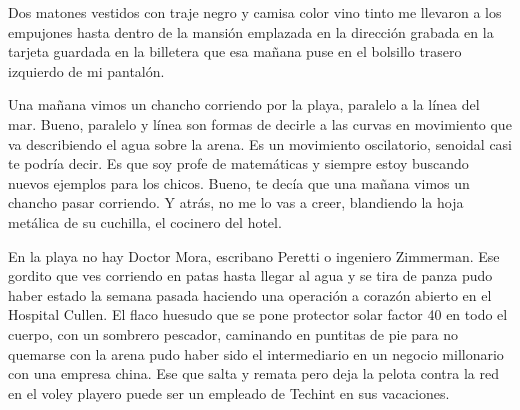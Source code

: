 \documentclass[12pt,twoside,openright,a5paper]{book}
\begin{document}
Dos matones vestidos con traje negro y camisa color vino tinto
me llevaron a los empujones hasta dentro de la mansión emplazada en la
dirección grabada en la tarjeta guardada en la billetera que esa mañana
puse en el bolsillo trasero izquierdo de mi pantalón.


\vspace{0.5cm}

\hrulefill\hspace{0.2cm} \decofourleft\decofourright \hspace{0.2cm} \hrulefill
\vspace{0.5cm}

Una mañana vimos un chancho corriendo por la playa, paralelo a la línea del
mar. Bueno, paralelo y línea son formas de decirle a las curvas en movimiento
que va describiendo el agua sobre la arena. Es un movimiento oscilatorio,
senoidal casi te podría decir. Es que soy profe de matemáticas y siempre
estoy buscando nuevos ejemplos para los chicos. Bueno, te decía que una
mañana vimos un chancho pasar corriendo. Y atrás, no me lo vas a creer,
blandiendo la hoja metálica de su cuchilla, el cocinero del hotel.

\vspace{0.5cm}
\afterpage{}
\hrulefill\hspace{0.2cm} \decofourleft\decofourright \hspace{0.2cm} \hrulefill
\vspace{0.5cm}

En la playa no hay Doctor Mora, escribano Peretti
o ingeniero Zimmerman. Ese gordito que ves corriendo en patas hasta llegar
al agua y se tira de panza pudo haber estado la semana pasada haciendo una
operación a corazón abierto en el Hospital Cullen. El flaco huesudo que se
pone protector solar factor 40 en todo el cuerpo, con un sombrero pescador,
caminando en puntitas de pie para no quemarse con la arena pudo haber sido
el intermediario en un negocio millonario con una empresa china. Ese que
salta y remata pero deja la pelota contra la red en el voley playero puede
ser un empleado de Techint en sus vacaciones.

\vspace{0.5cm}

\hrulefill\hspace{0.2cm} \decofourleft\decofourright \hspace{0.2cm} \hrulefill
\vspace{0.5cm}
\end{document}
